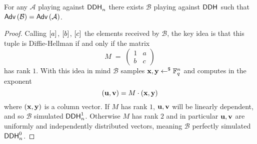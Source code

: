 \begin{lemma}
	For any $\mathcal{A}$ playing against $\ddh_n$ there exists $\mathcal{B}$ playing against $\ddh$ such that $\adv{\mathcal{B}} = \adv{\mathcal{A}}$.
\end{lemma}
\begin{proof}
	Calling $\gexp{}{a}$, $\gexp{}{b}$, $\gexp{}{c}$ the elements received by $\mathcal{B}$, the key idea is that this tuple is Diffie-Hellman if and only if the matrix
	\[
		M 
			\; = \;
		\left(
		\begin{matrix}
			1 & a \\
			b & c 
		\end{matrix}
		\right)
	\]
	has rank $1$. With this idea in mind $\mathcal{B}$ samples $\vc{x}, \vc{y} \rgets \F_q^n$ and computes in the exponent
	\[
		(\vc{u}, \vc{v}) = M \cdot (\vc{x}, \vc{y})
	\]
	where $(\vc{x}, \vc{y})$ is a column vector.
	If $M$ has rank $1$, $\vc{u}, \vc{v}$ will be linearly dependent, and so $\mathcal{B}$ simulated $\ddh[1]_n$. 
	Otherwise $M$ has rank $2$ and in particular $\vc{u}, \vc{v}$ are uniformly and independently distributed vectors, meaning $\mathcal{B}$ perfectly simulated $\ddh[0]_n$.
\end{proof}


